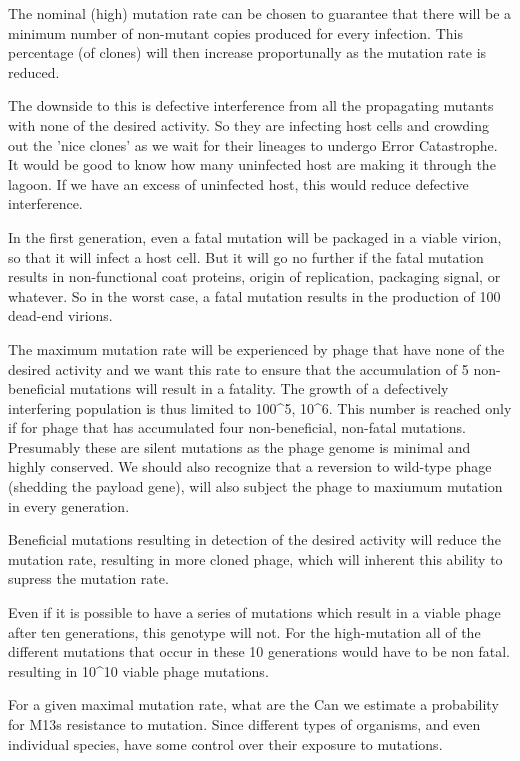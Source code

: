 \documentclass[10pt,letterpaper]{article}
\begin{document}
The nominal (high) mutation rate can be chosen to guarantee that there will be a minimum number of non-mutant copies produced for every infection.  This percentage (of clones) will then increase proportunally as the mutation rate is reduced.

The downside to this is defective interference from all the propagating mutants with none of the desired activity. So they are infecting host cells and crowding out the 'nice clones' as we wait for their lineages to undergo Error Catastrophe.  It would be good to know how many uninfected host are making it through the lagoon. If we have an excess of uninfected host, this would reduce defective interference.

In the first generation, even a fatal mutation will be packaged in a viable virion, so that it will infect a host cell. But it will go no further if the fatal mutation results in non-functional coat proteins, origin of replication, packaging signal, or whatever. So in the worst case, a fatal mutation results in the production of 100 dead-end virions.

The maximum mutation rate will be experienced by phage that have none of the desired activity and we want this rate to ensure that the accumulation of 5 non-beneficial mutations will result in a fatality.  The growth of a defectively interfering population is thus limited to 100^5, 10^6.  This number is reached only if for phage that has accumulated four non-beneficial, non-fatal mutations.  Presumably these are silent mutations as the phage genome is minimal and highly conserved. We should also recognize that a reversion to wild-type phage (shedding the payload gene), will also subject the phage to maxiumum mutation in every generation.

Beneficial mutations resulting in detection of the desired activity will reduce the mutation rate, resulting in more cloned phage, which will inherent this ability to supress the mutation rate.

Even if it is possible to have a series of mutations which result in a viable phage after ten generations, this genotype will not.  For the high-mutation
all of the different mutations that occur in these 10 generations would have to be non fatal. resulting in 10^10 viable phage mutations.

For a given maximal mutation rate, what are the
Can we estimate a probability for M13s resistance to mutation.
Since different types of organisms, and even individual species, have some control over their exposure to mutations.
\end{document}
